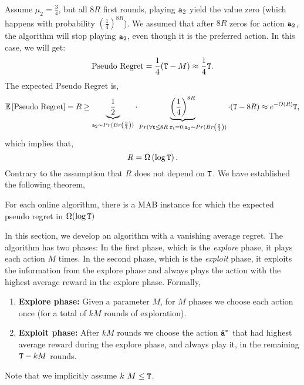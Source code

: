 Assume $\mu_2 = \frac{3}{4}$, but all $8R$ first rounds, playing
${\tt a}_2$ yield the value zero (which happens with probability
$\left(\frac{1}{4}\right)^{8R}$). We assumed that after $8R$ zeros for action ${\tt a}_2$, the algorithm will stop playing ${\tt a}_2$, even though
it is the preferred action. In this case, we will get:
\[
\text{Pseudo Regret} = \frac{1}{4} ({\tt T} - M) \approx \frac{1}{4}{\tt T}.
\]
The expected Pseudo Regret is,
\[
\mathbb{E}\left[\text{Pseudo Regret}\right] = R \geq
\underbrace{\frac{1}{2}}_{{\tt a}_{2}\sim Pr(Br\left(\frac{3}{4}\right))}
\cdot \underbrace{\left(\frac{1}{4}\right)^{8R}}_{Pr(\forall {\tt t}\leq 8R \; {\tt r}_{\tt t}= 0 |
{\tt a}_{2}\sim Pr(Br\left(\frac{3}{4}\right))} \cdot ({\tt T} - 8R) \approx
e^{-O(R)}{\tt T},
\]
which implies that,
\[
R=\Omega\left(\log {\tt T}\right).
\]
Contrary to the assumption that $R$ does not depend on ${\tt T}$.
%
We have established the following theorem,
\begin{theorem}
   For each online algorithm, there is a MAB instance for which the expected pseudo regret in $\Omega 
(\log {\tt T})$
\end{theorem}


In this section, we develop an algorithm with a vanishing average regret. The algorithm  has two phases: In the first phase, which is the \emph{explore}  phase, it  plays each action  $M$ times. In the second phase, which is the \emph{exploit} phase,
it  exploits the information from the explore phase and  always plays  the action with the highest average reward in the explore phase. Formally,

\begin{enumerate}
%
\item \textbf{Explore phase:} Given a parameter $M$,
%
for $M$ phases we choose each action once (for a total of $kM$ rounds of exploration).
%
\item \textbf{Exploit phase:} After $kM$ rounds we  choose the action $\hat{{\tt a}}^*$ that had highest
average reward during the explore phase, and always play it, in the remaining ${\tt T}-kM$ rounds.
\end{enumerate}
Note that we implicitly assume $k\ M \leq {\tt T}$. 

